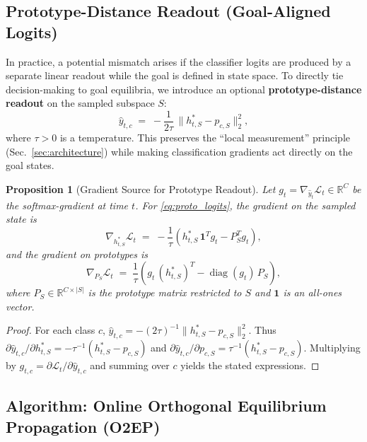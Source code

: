 \documentclass[11pt,a4paper]{article}
\newtheorem{proposition}[theorem]{Proposition}
\newcommand{\LL}{\mathcal{L}}
\begin{document}
\subsection{Prototype-Distance Readout (Goal-Aligned Logits)}

In practice, a potential mismatch arises if the classifier logits are produced by a separate linear readout while the goal is defined in state space. To directly tie decision-making to goal equilibria, we introduce an optional \textbf{prototype-distance readout} on the sampled subspace $S$:
\begin{equation}
\label{eq:proto_logits}
\hat{y}_{t,c} \;=\; -\frac{1}{2\tau}\,\|h_{t,S}^* - p_{c,S}\|_2^2,
\end{equation}
where $\tau>0$ is a temperature. This preserves the ``local measurement'' principle (Sec.~\ref{sec:architecture}) while making classification gradients act directly on the goal states.

\begin{proposition}[Gradient Source for Prototype Readout]
\label{prop:proto_grad}
Let $g_t=\nabla_{\hat{y}_t}\LL_t\in\mathbb{R}^{C}$ be the softmax-gradient at time $t$. For \eqref{eq:proto_logits}, the gradient on the sampled state is
\begin{equation}
\nabla_{h_{t,S}^*}\LL_t \;=\; -\frac{1}{\tau}\left(h_{t,S}^*\,\mathbf{1}^T g_t - P_S^T g_t\right),
\end{equation}
and the gradient on prototypes is
\begin{equation}
\nabla_{P_S}\LL_t \;=\; \frac{1}{\tau}\left(g_t\, (h_{t,S}^*)^T - \operatorname{diag}(g_t)\,P_S\right),
\end{equation}
where $P_S\in\mathbb{R}^{C\times |S|}$ is the prototype matrix restricted to $S$ and $\mathbf{1}$ is an all-ones vector.
\end{proposition}

\begin{proof}
For each class $c$, $\hat{y}_{t,c}=-(2\tau)^{-1}\|h_{t,S}^*-p_{c,S}\|_2^2$. Thus
$\partial \hat{y}_{t,c}/\partial h_{t,S}^* = -\tau^{-1}(h_{t,S}^*-p_{c,S})$ and
$\partial \hat{y}_{t,c}/\partial p_{c,S} = \tau^{-1}(h_{t,S}^*-p_{c,S})$.
Multiplying by $g_{t,c}=\partial \LL_t/\partial \hat{y}_{t,c}$ and summing over $c$ yields the stated expressions.
\end{proof}

\subsection{Algorithm: Online Orthogonal Equilibrium Propagation (O2EP)}
\end{document}
